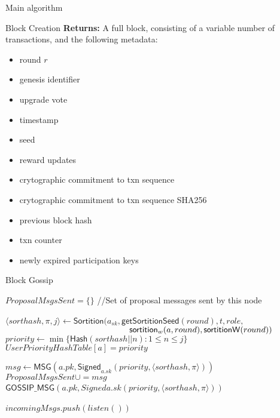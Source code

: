 \documentclass[10pt,a4paper]{article}
\begin{document}
\begin{section}{Main algorithm}
\begin{subsection}{Block Creation}
\noindent \textbf{Returns:} 
A full block, consisting of a variable number of transactions, and the following metadata:
\begin{itemize}
    \item round $r$
    \item genesis identifier
    \item upgrade vote
    \item timestamp
    \item seed
    \item reward updates
    \item crytographic commitment to txn sequence
    \item crytographic commitment to txn sequence SHA256
    \item previous block hash
    \item txn counter
    \item newly expired participation keys
  \end{itemize}

\end{subsection}
\begin{subsection}{Block Gossip}

\begin{algorithm}
    \begin{algorithmic}[1]
        \State $ProposalMsgsSent = \{\}$ //Set of proposal messages sent by this node

            \State $\langle sorthash, \pi, j\rangle\gets 
            \mathsf{Sortition}(
                a_{sk}, 
                \mathsf{getSortitionSeed}(round), 
                t, 
                role, $ \newline
                ${}$ ${\hskip 5.2cm}\mathsf{sortition}_w(a, round), 
                \mathsf{sortitionW}(round)
            )$
                \State $priority \gets \min\{\mathsf{Hash}(sorthash || n):1\le n\le j\}$
                \State $UserPriorityHashTable[a] = priority$

                \State $msg \gets \mathsf{MSG}(a.pk, \mathsf{Signed}_{a.sk}(priority, \langle sorthash, \pi\rangle))$
                \State $ProposalMsgsSent \cup= msg$
                \State $\mathsf{GOSSIP\_MSG}(a.pk, Signed{a.sk}(priority, \langle sorthash, \pi\rangle))$
            \EndIf
        \EndFor\

            \State $incomingMsgs.push(listen())$
        \EndWhile\


\end{algorithmic}
\end{algorithm}
\end{subsection}
\end{section}
\end{document}
